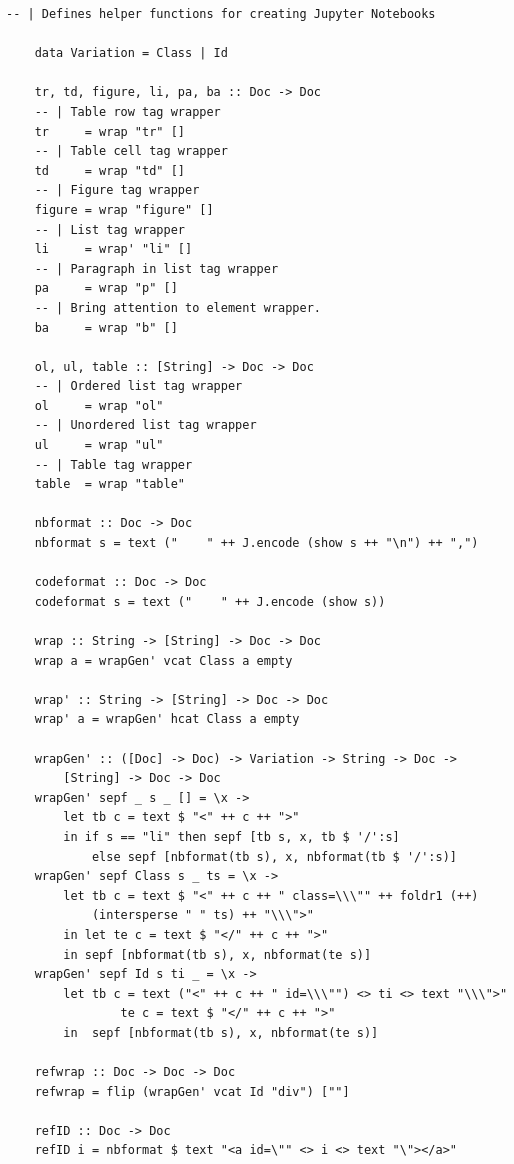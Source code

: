 \newpage

\begin{lstlisting}[language=haskell1, 
	basicstyle=\linespread{1.1}\small\ttfamily]
	-- | Defines helper functions for creating Jupyter Notebooks
		
	data Variation = Class | Id
	
	tr, td, figure, li, pa, ba :: Doc -> Doc
	-- | Table row tag wrapper
	tr     = wrap "tr" []
	-- | Table cell tag wrapper
	td     = wrap "td" []
	-- | Figure tag wrapper
	figure = wrap "figure" []
	-- | List tag wrapper
	li     = wrap' "li" []
	-- | Paragraph in list tag wrapper
	pa     = wrap "p" []
	-- | Bring attention to element wrapper.
	ba     = wrap "b" []
	
	ol, ul, table :: [String] -> Doc -> Doc
	-- | Ordered list tag wrapper
	ol     = wrap "ol"
	-- | Unordered list tag wrapper
	ul     = wrap "ul"
	-- | Table tag wrapper
	table  = wrap "table"
	
	nbformat :: Doc -> Doc
	nbformat s = text ("    " ++ J.encode (show s ++ "\n") ++ ",")
	
	codeformat :: Doc -> Doc
	codeformat s = text ("    " ++ J.encode (show s))
	
	wrap :: String -> [String] -> Doc -> Doc
	wrap a = wrapGen' vcat Class a empty
	
	wrap' :: String -> [String] -> Doc -> Doc
	wrap' a = wrapGen' hcat Class a empty
	
	wrapGen' :: ([Doc] -> Doc) -> Variation -> String -> Doc -> 
		[String] -> Doc -> Doc
	wrapGen' sepf _ s _ [] = \x -> 
		let tb c = text $ "<" ++ c ++ ">"
		in if s == "li" then sepf [tb s, x, tb $ '/':s] 
			else sepf [nbformat(tb s), x, nbformat(tb $ '/':s)]
	wrapGen' sepf Class s _ ts = \x ->
		let tb c = text $ "<" ++ c ++ " class=\\\"" ++ foldr1 (++) 
			(intersperse " " ts) ++ "\\\">"
		in let te c = text $ "</" ++ c ++ ">"
		in sepf [nbformat(tb s), x, nbformat(te s)]
	wrapGen' sepf Id s ti _ = \x ->
		let tb c = text ("<" ++ c ++ " id=\\\"") <> ti <> text "\\\">"
				te c = text $ "</" ++ c ++ ">"
		in  sepf [nbformat(tb s), x, nbformat(te s)] 
	
	refwrap :: Doc -> Doc -> Doc
	refwrap = flip (wrapGen' vcat Id "div") [""]
	
	refID :: Doc -> Doc 
	refID i = nbformat $ text "<a id=\"" <> i <> text "\"></a>"
	

\end{lstlisting}
